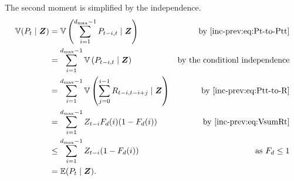 \documentclass[thesis.tex]{subfiles}
\begin{document}
The second moment is simplified by the independence.
\begin{align}
\V(P_t \mid \vec{Z})
  &= \V\left(\sum_{i=1}^{d_\text{max}-1} P_{t-i,t} \mid \vec{Z} \right) &\text{by \cref{inc-prev:eq:Pt-to-Ptt}} \\
  &= \sum_{i=1}^{d_\text{max}-1} \V\left(P_{t-i,t} \mid \vec{Z} \right) &\text{by the conditionl independence} \\
  &= \sum_{i=1}^{d_\text{max}-1} \V\left(\sum_{j=0}^{i-1} R_{t-i,t-i+j} \mid \vec{Z} \right) &\text{by~\cref{inc-prev:eq:Ptt-to-R}}\\
  &= \sum_{i=1}^{d_\text{max}-1} Z_{t-i} F_d(i) (1 - F_d(i)) &\text{by~\cref{inc-prev:eq:VsumRt}} \\
  &\leq \sum_{i=1}^{d_\text{max}-1} Z_{t-i} (1 - F_d(i)) &\text{as $F_d \leq 1$}\\
  &= \E(P_t \mid \vec{Z}). \label{inc-prev:eq:boundVPt}
\end{align}


\end{document}
